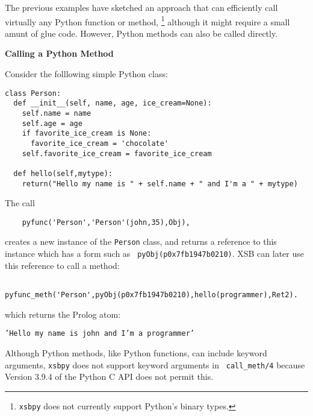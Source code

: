 The previous examples have sketched an approach that can efficiently
call virtually any Python function or method, \footnote{{\tt xsbpy}
  does not currently support Python's binary types.}  although it
might require a small amunt of glue code.  However, Python methods can
also be called directly.

\begin{example} \rm {\bf Calling a Python Method} \label{xsbpy-examp:method}

\noindent
Consider the folllowing simple Python class:

\begin{verbatim}
class Person:
  def __init__(self, name, age, ice_cream=None):
    self.name = name
    self.age = age
    if favorite_ice_cream is None:
      favorite_ice_cream = 'chocolate'
    self.favorite_ice_cream = favorite_ice_cream

  def hello(self,mytype):
    return("Hello my name is " + self.name + " and I'm a " + mytype)
\end{verbatim}

\noindent
The call

\begin{verbatim}
    pyfunc('Person','Person'(john,35),Obj),
\end{verbatim}
\noindent
creates a new instance of the {\tt Person} class, and returns a
reference to this instance which has a form such as {\tt
  pyObj(p0x7fb1947b0210)}.  XSB can later use this reference to call a
method:
\begin{verbatim}
    pyfunc_meth('Person',pyObj(p0x7fb1947b0210),hello(programmer),Ret2).
\end{verbatim}

\noindent
which returns the Prolog atom:

{\tt 'Hello my name is john and I'm a programmer'}

\noindent
Although Python methods, like Python functions, can include keyword
arguments, {\tt xsbpy} does not support keyword arguments in {\tt
  call\_meth/4} because Version 3.9.4 of the Python C API does not
permit this.
\end{example}

